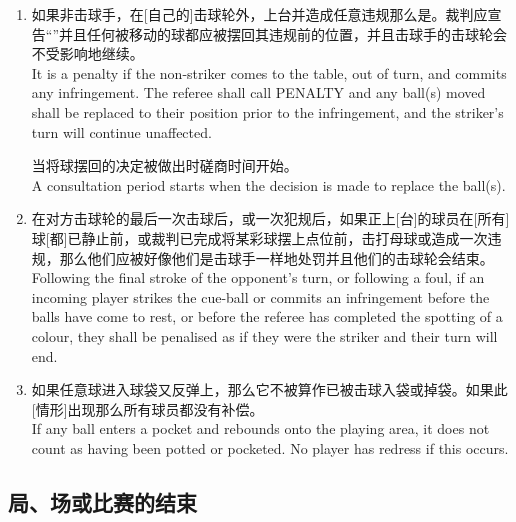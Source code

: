 \begin{enumerate}[label=(\alph*)]
    If the striker fails to pot a ball, they must leave the table without undue delay. In the event that they should commit any foul before, or while leaving the table, they will be penalised as provided for in Section \ref{223} Rule \ref{22311}. The next stroke is then played from where the cue-ball comes to rest, or from in-hand if the cue-ball is not in play, except when the cue-ball is replaced in accordance with Section \ref{223} Rules \ref{22310}\ref{22310i}, \ref{22314}\ref{22314e} and \ref{22316}.
    \item \label{2233k}如果非击球手，在[自己的]击球轮外，上台并造成任意违规那么是\termpenalty{}。裁判应宣告“\termpenalty{}”并且任何被移动的球都应被摆回其违规前的位置，并且击球手的击球轮会不受影响地继续。\\
    It is a penalty if the non-striker comes to the table, out of turn, and commits any infringement. The referee shall call PENALTY and any ball(s) moved shall be replaced to their position prior to the infringement, and the striker's turn will continue unaffected.

    当将球摆回的决定被做出时磋商时间开始。\\
    A consultation period starts when the decision is made to replace the ball(s).
    \item 在对方击球轮的最后一次击球后，或一次犯规后，如果正上[台]的球员在[所有]球[都]已静止前，或裁判已完成将某彩球摆上点位前，击打母球或造成一次违规，那么他们应被好像他们是击球手一样地处罚并且他们的击球轮会结束。\\
    Following the final stroke of the opponent's turn, or following a foul, if an incoming player strikes the cue-ball or commits an infringement before the balls have come to rest, or before the referee has completed the spotting of a colour, they shall be penalised as if they were the striker and their turn will end.
    \item 如果任意球进入球袋又反弹上\playingarea{}，那么它不被算作已被击球入袋或掉袋。如果此[情形]出现那么所有球员都没有补偿。\\
    If any ball enters a pocket and rebounds onto the playing area, it does not count as having been potted or pocketed. No player has redress if this occurs.
\end{enumerate}

\subsection{局、场或比赛的结束}\label{2234}

